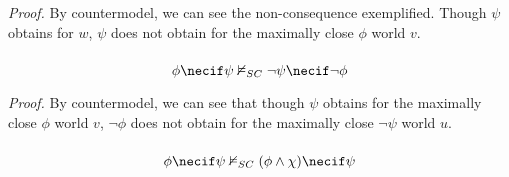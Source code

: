 \documentclass{article}
\begin{document}
            \textit{Proof.} By countermodel, we can see the non-consequence exemplified. Though $\psi$ obtains for $w$, $\psi$ does not obtain for the maximally close $\phi$ world $v$.

            \begin{center}
            \end{center}

            \subsubsection{}
            $$\phi \necif \psi \nvDash_{SC} \lnot \psi \necif \lnot \phi$$

            \textit{Proof.} By countermodel, we can see that though $\psi$ obtains for the maximally close $\phi$ world $v$, $\lnot \phi$ does not obtain for the maximally close $\lnot \psi$ world $u$.
            \begin{center}
            \end{center}

            \subsubsection{}
            $$\phi \necif \psi \nvDash_{SC} (\phi \wedge \chi) \necif \psi$$
\end{document}
